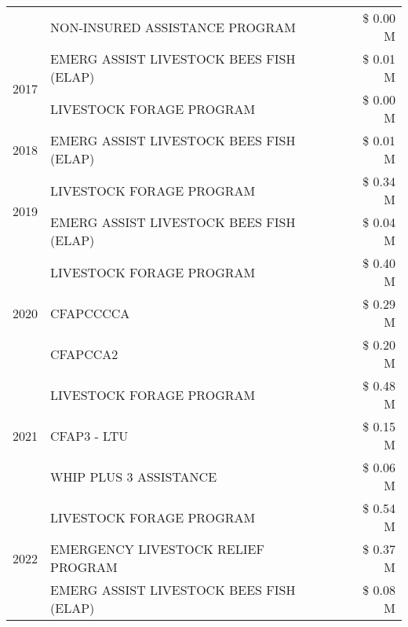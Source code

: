 \begin{tabular}{llr}
 & NON-INSURED ASSISTANCE PROGRAM & \$ 0.00 M \\
\cline{1-3}
\multirow[t]{2}{*}{2017} & EMERG ASSIST LIVESTOCK BEES FISH (ELAP) & \$ 0.01 M \\
 & LIVESTOCK FORAGE PROGRAM & \$ 0.00 M \\
\cline{1-3}
2018 & EMERG ASSIST LIVESTOCK BEES FISH (ELAP) & \$ 0.01 M \\
\cline{1-3}
\multirow[t]{2}{*}{2019} & LIVESTOCK FORAGE PROGRAM & \$ 0.34 M \\
 & EMERG ASSIST LIVESTOCK BEES FISH (ELAP) & \$ 0.04 M \\
\cline{1-3}
\multirow[t]{3}{*}{2020} & LIVESTOCK FORAGE PROGRAM & \$ 0.40 M \\
 & CFAPCCCCA & \$ 0.29 M \\
 & CFAPCCA2 & \$ 0.20 M \\
\cline{1-3}
\multirow[t]{3}{*}{2021} & LIVESTOCK FORAGE PROGRAM & \$ 0.48 M \\
 & CFAP3 - LTU & \$ 0.15 M \\
 & WHIP PLUS 3 ASSISTANCE & \$ 0.06 M \\
\cline{1-3}
\multirow[t]{3}{*}{2022} & LIVESTOCK FORAGE PROGRAM & \$ 0.54 M \\
 & EMERGENCY LIVESTOCK RELIEF PROGRAM & \$ 0.37 M \\
 & EMERG ASSIST LIVESTOCK BEES FISH (ELAP) & \$ 0.08 M \\
\cline{1-3}
\bottomrule
\end{tabular}
